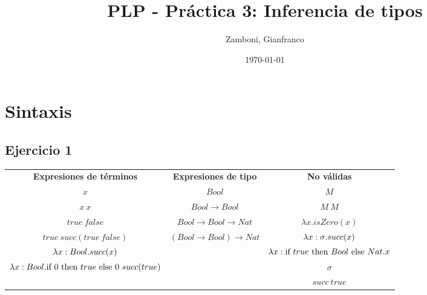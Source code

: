 \documentclass[10pt,a4paper, landscape]{article}
\begin{document}
\title{PLP - Práctica 3: Inferencia de tipos}

\date{\today}

\author{Zamboni, Gianfranco}

\maketitle
\setcounter{page}{1}


\section*{\centering Sintaxis}
\subsection{Ejercicio 1}
\begin{multicols}{2}

\end{multicols}

\vspace*{5mm}
\begin{center}
    \begin{tabular}{c|c|c}
        \textbf{Expresiones de términos} & \textbf{Expresiones de tipo} & \textbf{No válidas}\\
       $x$ & $ Bool$ & $M$ \\ 
       $x~x$ & $ Bool\to  Bool$ & $M~M$ \\      
       $true~false$ & $ Bool\to  Bool\to  Nat$ & $\lambda x.isZero(x)$ \\
       $true~succ(true~false)$ & $( Bool\to  Bool)\to  Nat$ & ${\lambda x: \sigma \text{.} succ(x)}$\\
       $\lambda x:  Bool \text{.} succ(x)$ & & $\lambda x:\text{if } true \text{ then }  Bool \text{ else }  Nat.x$ \\
       $\lambda x:  Bool \text{.} \text{if } 0 \text{ then } true \text{ else } 0~succ(true)$ & & $\sigma$ \\
       & & $succ~true$
    \end{tabular}
\end{center}
\end{document}
